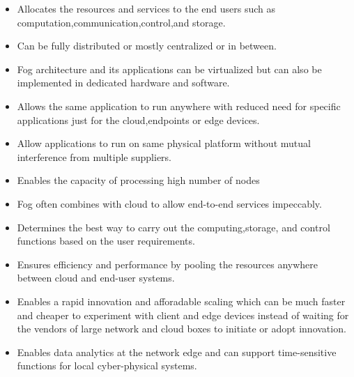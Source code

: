 \begin{itemize}
	\item Allocates the resources and services to the end users such as computation,communication,control,and storage.\\
	\item Can be fully distributed or mostly centralized or in between.\\
	\item Fog architecture and its applications can be virtualized but can also be implemented in dedicated hardware and software.\\
	\item Allows the same application to run anywhere with reduced need for specific applications just for the cloud,endpoints or edge devices.\\
	\item Allow applications to run on same physical platform without mutual interference from multiple suppliers.\\
	\item Enables the capacity of processing high number of nodes\\
	\item Fog often combines with cloud to allow end-to-end services impeccably.\\
	\item Determines the best way to carry out the computing,storage, and control functions based on the user requirements.\\
	\item Ensures efficiency and performance by pooling the resources anywhere between cloud and end-user systems.\\
	\item Enables a rapid innovation and afforadable scaling which can be much faster and cheaper to experiment with client and edge devices instead of waiting for the vendors of large network and cloud boxes to initiate or adopt innovation.\\
	\item Enables data analytics at the network edge and can support time-sensitive functions for local cyber-physical systems.\\
	
\end{itemize}
